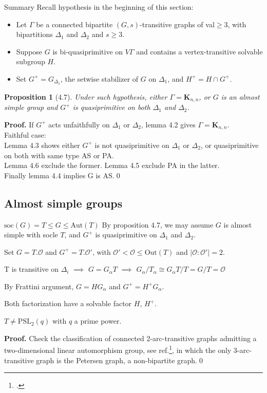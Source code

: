 \documentclass{beamer}
\def\PSL{\mathrm{PSL}}
\def\Aut{\mathrm{Aut}}
\def\Out{\mathrm{Out}}
\def\soc{\mathrm{soc}}
\def\proof#1{\textbf{Proof.}{#1}\qed}
\newtheorem{proposition}{Proposition}[theorem]
\begin{document}
\begin{frame}{Summary}
Recall hypothesis in the beginning of this section:
\begin{itemize}
	\item Let $\Gamma$ be a connected bipartite $(G,s)$-transitive graphs of val$\geq 3$, with bipartitions $\Delta_1$ and $\Delta_2$ and $s\geq 3$.
	\item Suppose $G$ is bi-quasiprimitive on $V\Gamma$ and contains a vertex-transitive solvable subgroup $H$. 
	\item Set $G^+=G_{\Delta_1}$, the setwise stabilizer of $G$ on $\Delta_1$, and $H^+=H\cap G^+$.
\end{itemize}

\begin{proposition}[4.7]
Under such hypothesis, either $\Gamma=\mathbf{K}_{n,n}$, or $G$ is an almost simple group and $G^+$ is quasiprimitive on both $\Delta_1$ and $\Delta_2$.
\end{proposition}
\proof{ If $G^+$ acts unfaithfully on $\Delta_1$ or $\Delta_2$, lemma 4.2 gives $\Gamma=\mathbf{K}_{n,n}$.\\
Faithful case: \\Lemma 4.3 shows either $G^+$ is not quasiprimitive on $\Delta_1$ or $\Delta_2$, or quasiprimitive on both with same type AS or PA.\\Lemma 4.6 exclude the former. Lemma 4.5 exclude PA in the latter.\\Finally lemma 4.4 implies G is AS.}
\end{frame}

\subsection{Almost simple groups}
\begin{frame}{$\soc(G)=T\leq G\leq \Aut(T)$}
By proposition 4.7, we may assume $G$ is almost simple with socle $T$, and $G^+$ is quasiprimitive on $\Delta_1$ and $\Delta_2$.

Set $G=T.\mathcal{O}$ and $G^+=T.\mathcal{O}'$, with $\mathcal{O}'<\mathcal{O}\leq \Out(T)$ and $|\mathcal{O}:\mathcal{O}'|=2$.

T is transitive on $\Delta_i$ $\implies$ $G=G_\alpha T$ $\implies$ $G_\alpha/T_\alpha\cong G_\alpha T/ T=G/T=\mathcal{O}$

By Frattini argument, $G=HG_\alpha$ and $G^+=H^+G_\alpha$. 

Both factorization have a solvable factor $H$, $H^+$.

\begin{lemma}[5.1]
$T\neq \PSL_2(q)$ with $q$ a prime power.
\end{lemma}
\proof{ Check the classification of connected 2-arc-transitive graphs admitting a two-dimensional linear automorphism group, see ref.\footcite{HASSANI1999twoarc}, in which the only 3-arc-transitive graph is the Petersen graph, a non-bipartite graph.}
\end{frame}
\end{document}
